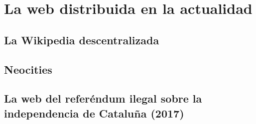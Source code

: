 \documentclass[12pt]{article} %
\begin{document}


\section{La web distribuida en la actualidad} %
\label{sec:la_web_distribuida_en_la_actualidad}

\subsection{La Wikipedia descentralizada} %
\label{sub:la_wikipedia_descentralizada}


\subsection{Neocities} %
\label{sub:neocities}


\subsection{La web del referéndum ilegal sobre la independencia de Cataluña (2017)} %
\label{sub:la_web_del_referéndum_catalán_de_2017}




\newpage
\printbibliography
\end{document}

